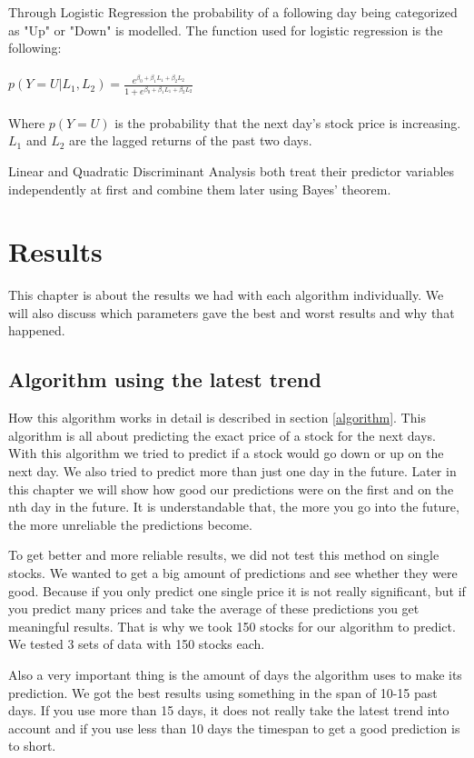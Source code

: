 \documentclass[conference]{IEEEtran}
\begin{document}
Through Logistic Regression the probability of a following day being categorized as "Up" or "Down" is modelled. The function used for logistic regression is the following:
\\
\\
$p(Y = U | L_1, L_2) = \frac{e^{\beta_0 + \beta_1 L_1 + \beta_2 L_2}}{1 + e^{\beta_0 + \beta_1 L_1 + \beta_2 L_2}}$
\\
\\
Where $p(Y = U)$ is the probability that the next day's stock price is increasing. $L_1$ and $L_2$ are the lagged returns of the past two days.

Linear and Quadratic Discriminant Analysis both treat their predictor variables independently at first and combine them later using Bayes' theorem.
\section{Results}
\label{results}

This chapter is about the results we had with each algorithm individually. We will also discuss which parameters gave the best and worst results and why that happened. 

\subsection{Algorithm using the latest trend}

How this algorithm works in detail is described in section \ref{algorithm}. This algorithm is all about predicting the exact price of a stock for the next days. With this algorithm we tried to predict if a stock would go down or up on the next day. We also tried to predict more than just one day in the future. Later in this chapter we will show how good our predictions were on the first and on the nth day in the future. It is understandable that, the more you go into the future, the more unreliable the predictions become. 

To get better and more reliable results, we did not test this method on single stocks. We wanted to get a big amount of predictions and see whether they were good. Because if you only predict one single price it is not really significant, but if you predict many prices and take the average of these predictions you get meaningful results. That is why we took 150 stocks for our algorithm to predict. We tested 3 sets of data with 150 stocks each.

Also a very important thing is the amount of days the algorithm uses to make its prediction. We got the best results using something in the span of 10-15 past days. If you use more than 15 days, it does not really take the latest trend into account and if you use less than 10 days the timespan to get a good prediction is to short.
\end{document}
